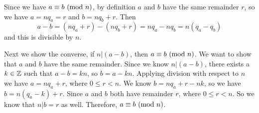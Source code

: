 Since we have \({a}\equiv{b}\text{ (mod } {n}\text{)}\), by definition \(a\) and \(b\) have the same remainder \(r\), so we have \(a = nq_a = r\) and \(b = nq_b + r\). Then \[a - b = (nq_a + r) - (nq_b + r) = nq_a - nq_b = n(q_a - q_b)\] and this is divisible by \(n\).

Next we show the converse, if \(n | (a-b)\), then \({a}\equiv{b}\text{ (mod } {n}\text{)}\). We want to show that \(a\) and \(b\) have the same remainder. Since we know \(n | (a-b)\), there exists a \(k \in \mathbb{Z}\) such that \(a-b = kn\), so \(b = a - kn\). Applying division with respect to \(n\) we have \(a = nq_a + r\), where \(0 \leq r < n\). We know \(b = nq_a + r - nk\), so we have \(b = n(q_a - k) + r\). Since \(a\) and \(b\) both have remainder \(r\), where \(0 \leq r < n\). So we know that \(n|b = r\) as well. Therefore, \({a}\equiv{b}\text{ (mod } {n}\text{)}\).

